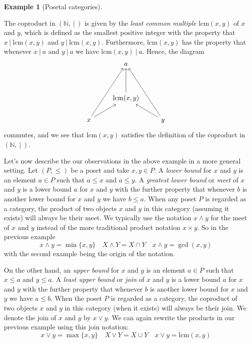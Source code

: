 \documentclass[10pt,oneside]{book}
\newcommand{\N}{\mathbb{N}}
\newcommand{\lcm}{\mathrm{lcm}}
\theoremstyle{plain}
\theoremstyle{definition}
\newtheorem{ex}[thm]{Example}
\theoremstyle{remark}
\numberwithin{equation}{section}
\numberwithin{figure}{section}
\begin{document}
\begin{ex}[Posetal categories]
\begin{enumerate}[label=(\roman*)]
The coproduct in $(\N, ~|~)$ is given by the \emph{least common multiple} $\lcm(x, y)$ of $x$ and $y$, which is defined as the smallest positive integer with the property that $x ~|~ \lcm(x, y)$ and $y ~|~ \lcm(x, y)$. Furthermore, $\lcm(x, y)$ has the property that whenever $x ~|~ a$ and $y ~|~ a$ we have $\lcm(x, y) ~|~ a$. Hence, the diagram 
\[\begin{tikzcd}
    & a \\
    \\
    & {\lcm(x, y)} \\
    x && y
    \arrow[from=4-1, to=3-2]
    \arrow[from=4-3, to=3-2]
    \arrow[from=3-2, to=1-2]
    \arrow[from=4-1, to=1-2]
    \arrow[from=4-3, to=1-2]
\end{tikzcd}\]
commutes, and we see that $\lcm(x, y)$ satisfies the definition of the coproduct in $(\N, ~|~)$.
\end{enumerate}
\end{ex}
Let's now describe the our observations in the above example in a more general setting. Let $(P, \leq)$ be  a poset and take $x, y \in P$. A \emph{lower bound} for $x$ and $y$ is an element $a \in P$ such that $a \leq x$ and $a \leq y$. A \emph{greatest lower bound} or \emph{meet} of $x$ and $y$ is a lower bound $a$ for $x$ and $y$ with the further property that whenever $b$ is another lower bound for $x$ and $y$ we have $b \leq a$. When any poset $P$ is regarded as a category, the product of two objects $x$ and $y$ in this category (assuming it exists) will always be their meet. We typically use the notation $x \wedge y$ for the meet of $x$ and $y$ instead of the more traditional product notation $x \times y$. So in the previous example
\[x \wedge y = \min\{x, y\} \quad X \wedge Y = X \cap Y  \quad x \wedge y =  \gcd(x, y) \]
with the second example being the origin of the notation.

On the other hand, an \emph{upper bound} for $x$ and $y$ is an element $a \in P$ such that $x \leq a$ and $y \leq a$. A \emph{least upper bound} or \emph{join} of $x$ and $y$ is a lower bound $a$ for $x$ and $y$ with the further property that whenever $b$ is another lower bound for $x$ and $y$ we have $a \leq b$. When the poset $P$ is regarded as a category, the coproduct of two objects $x$ and $y$ in this category (when it exists) will always be their join. We denote the join of $x$ and $y$ by $x \vee y$. We can again rewrite the products in our previous example using this join notation:
\[x \vee y = \max\{x, y\} \quad X \vee Y = X \cup Y \quad x \vee y = \lcm(x, y)\]
\end{document}
